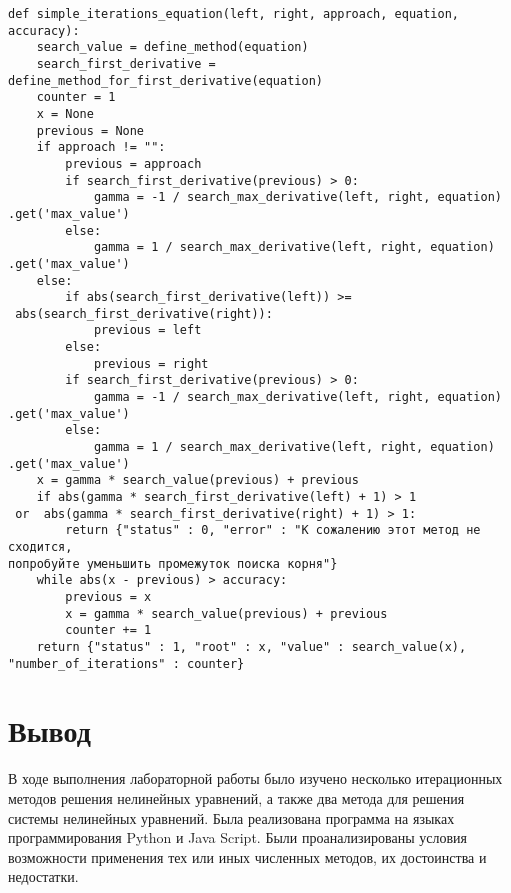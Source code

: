 \documentclass[14pt]{article}
\newcommand\mysection[1]{%
	  \addcontentsline{toc}{section}{#1}%
	  \section*{#1}%
}
\begin{document}
\begin{verbatim}
def simple_iterations_equation(left, right, approach, equation, accuracy):
    search_value = define_method(equation)
    search_first_derivative = define_method_for_first_derivative(equation)
    counter = 1
    x = None
    previous = None
    if approach != "":
        previous = approach
        if search_first_derivative(previous) > 0:
            gamma = -1 / search_max_derivative(left, right, equation)
.get('max_value')
        else:
            gamma = 1 / search_max_derivative(left, right, equation)
.get('max_value')
    else:
        if abs(search_first_derivative(left)) >=
 abs(search_first_derivative(right)):
            previous = left
        else:
            previous = right
        if search_first_derivative(previous) > 0:
            gamma = -1 / search_max_derivative(left, right, equation)
.get('max_value')
        else:
            gamma = 1 / search_max_derivative(left, right, equation)
.get('max_value')
    x = gamma * search_value(previous) + previous
    if abs(gamma * search_first_derivative(left) + 1) > 1
 or  abs(gamma * search_first_derivative(right) + 1) > 1:
        return {"status" : 0, "error" : "К сожалению этот метод не сходится, 
попробуйте уменьшить промежуток поиска корня"}
    while abs(x - previous) > accuracy:
        previous = x
        x = gamma * search_value(previous) + previous
        counter += 1
    return {"status" : 1, "root" : x, "value" : search_value(x), 
"number_of_iterations" : counter}
\end{verbatim}
\mysection{Вывод}
В ходе выполнения лабораторной работы было изучено несколько итерационных методов решения нелинейных уравнений, а также два метода для решения системы нелинейных уравнений. 
Была реализована программа на языках программирования Python и Java Script. Были
проанализированы условия возможности применения тех или иных численных
методов, их достоинства и недостатки. 
\end{document}
